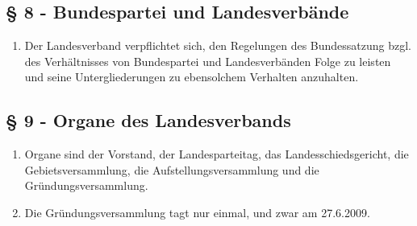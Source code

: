 \subsection{§ 8 - Bundespartei und Landesverbände}
\begin{enumerate}
\item Der Landesverband verpflichtet sich, den Regelungen des Bundessatzung
bzgl. des Verhältnisses von Bundespartei und Landesverbänden Folge zu leisten
und seine Untergliederungen zu ebensolchem Verhalten anzuhalten.
\end{enumerate}

\subsection{§ 9 - Organe des Landesverbands}
\begin{enumerate}
\item Organe sind der Vorstand, der Landesparteitag, das Landesschiedsgericht,
die Gebietsversammlung, die Aufstellungsversammlung und die
Gründungsversammlung.

\item Die Gründungsversammlung tagt nur einmal, und zwar am 27.6.2009. 
\end{enumerate}

